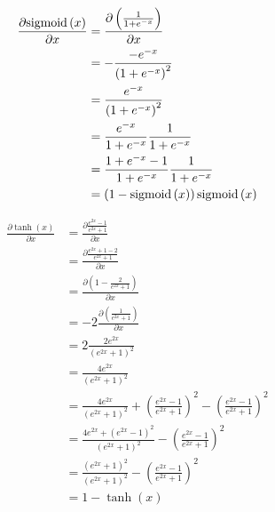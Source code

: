 \documentclass[runningheads,openany]{xhlPaper}
\begin{document}
\begin{equation}
\label{equ:mlp_activate_function_logistic_derivative}
\begin{aligned}
\frac{{\partial {\rm{sigmoid}}\left( x \right)}}{{\partial x}} &= \frac{{\partial \left( {\frac{1}{{1 + {e^{ - x}}}}} \right)}}{{\partial x}}\\
 &=  - \frac{{ - {e^{ - x}}}}{{{{\left( {1 + {e^{ - x}}} \right)}^2}}}\\
 &= \frac{{{e^{ - x}}}}{{{{\left( {1 + {e^{ - x}}} \right)}^2}}}\\
 &= \frac{{{e^{ - x}}}}{{1 + {e^{ - x}}}}\frac{1}{{1 + {e^{ - x}}}}\\
 &= \frac{{1 + {e^{ - x}} - 1}}{{1 + {e^{ - x}}}}\frac{1}{{1 + {e^{ - x}}}}\\
 &= \left( {1 - {\rm{sigmoid}}\left( x \right)} \right){\rm{sigmoid}}\left( x \right)
\end{aligned}
\end{equation}

\begin{equation}
\label{equ:mlp_activate_function_tanh_derivative}
\begin{aligned}
\frac{{\partial \tanh \left( x \right)}}{{\partial x}} &= \frac{{\partial \frac{{{e^{2x}} - 1}}{{{e^{2x}} + 1}}}}{{\partial x}}\\
 &= \frac{{\partial \frac{{{e^{2x}} + 1 - 2}}{{{e^{2x}} + 1}}}}{{\partial x}}\\
 &= \frac{{\partial \left( {1 - \frac{2}{{{e^{2x}} + 1}}} \right)}}{{\partial x}}\\
 &=  - 2\frac{{\partial \left( {\frac{1}{{{e^{2x}} + 1}}} \right)}}{{\partial x}}\\
 &= 2\frac{{2{e^{2x}}}}{{{{\left( {{e^{2x}} + 1} \right)}^2}}}\\
 &= \frac{{4{e^{2x}}}}{{{{\left( {{e^{2x}} + 1} \right)}^2}}}\\
 &= \frac{{4{e^{2x}}}}{{{{\left( {{e^{2x}} + 1} \right)}^2}}} + {\left( {\frac{{{e^{2x}} - 1}}{{{e^{2x}} + 1}}} \right)^2} - {\left( {\frac{{{e^{2x}} - 1}}{{{e^{2x}} + 1}}} \right)^2}\\
 &= \frac{{4{e^{2x}} + {{\left( {{e^{2x}} - 1} \right)}^2}}}{{{{\left( {{e^{2x}} + 1} \right)}^2}}} - {\left( {\frac{{{e^{2x}} - 1}}{{{e^{2x}} + 1}}} \right)^2}\\
 &= \frac{{{{\left( {{e^{2x}} + 1} \right)}^2}}}{{{{\left( {{e^{2x}} + 1} \right)}^2}}} - {\left( {\frac{{{e^{2x}} - 1}}{{{e^{2x}} + 1}}} \right)^2}\\
 &= 1 - \tanh \left( x \right)
\end{aligned}
\end{equation}
\end{document}
